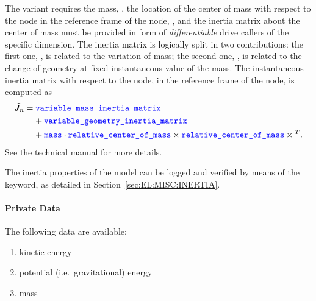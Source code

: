 The  variant requires the mass, ,
the location of the center of mass with respect to the node
in the reference frame of the node, ,
and the inertia matrix about the center of mass must be provided
in form of \emph{differentiable} drive callers of the specific dimension.
The inertia matrix is logically split in two contributions:
the first one, ,
is related to the variation of mass;
the second one, ,
is related to the change of geometry at fixed instantaneous value
of the mass.
The instantaneous inertia matrix with respect to the node,
in the reference frame of the node, is computed as
\begin{align}
	\tilde{\TT{J}}_n
	&=
	\nt{variable\_mass\_inertia\_matrix}
	\noindent \\
	&\mbox{\hphantom{= }}
	+
	\nt{variable\_geometry\_inertia\_matrix}
	\noindent \\
	&\mbox{\hphantom{= }}
	+
	\nt{mass}
	\cdot
	\nt{relative\_center\_of\_mass} \times \nt{relative\_center\_of\_mass} \times{}^T
	.
\end{align}
See the technical manual for more details.

The inertia properties of the model can be logged and verified
by means of the  keyword, as detailed
in Section~\ref{sec:EL:MISC:INERTIA}.

\paragraph{Private Data}
The following data are available:
\begin{enumerate}
\item {} kinetic energy
\item {} potential (i.e.\ gravitational) energy
\item {} mass
\end{enumerate}

